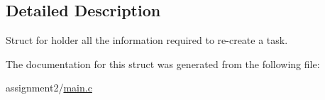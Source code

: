 \subsection{Detailed Description}
Struct for holder all the information required to re-\/create a task. 

The documentation for this struct was generated from the following file\+:\begin{DoxyCompactItemize}
\item 
assignment2/\hyperlink{main_8c}{main.\+c}\end{DoxyCompactItemize}
